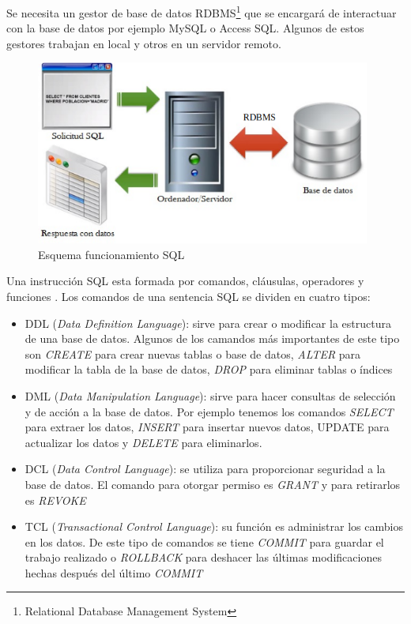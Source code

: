 Se necesita un gestor de base de datos RDBMS\footnote{Relational Database Management System}  que se encargará de interactuar con la base de datos por ejemplo MySQL o  Access SQL. Algunos de estos gestores trabajan en local y otros en un servidor remoto.\cite{rdbms}\\

\begin{figure}[H]
    \centering
    \includegraphics[width=11cm, keepaspectratio]{img/sql.png}
    \caption{Esquema funcionamiento SQL}
    \label{fig:sql}
\end{figure}
Una instrucción SQL esta formada por comandos, cláusulas, operadores y funciones . Los comandos de una sentencia SQL se dividen en cuatro tipos:
\begin{itemize}
\item DDL (\textit{Data Definition Language}): sirve para crear o modificar la estructura de una base de datos. Algunos de los camandos más importantes de este tipo son \textit{CREATE }para crear nuevas tablas o base de datos, \textit{ALTER} para modificar la tabla de la base de datos, \textit{DROP} para eliminar tablas o índices 
\item DML (\textit{Data Manipulation Language}): sirve para hacer consultas de selección y de acción a la base de datos. Por ejemplo tenemos los comandos \textit{SELECT} para extraer los datos,\textit{ INSERT} para insertar nuevos datos, UPDATE para actualizar los datos y \textit{DELETE} para eliminarlos.
\item DCL (\textit{Data Control Language}): se utiliza para proporcionar seguridad a la base de datos. El comando para otorgar permiso es \textit{GRANT} y para retirarlos es \textit{REVOKE}
\item TCL (\textit{Transactional Control Language}): su función es administrar los cambios en los datos. De este tipo de comandos se tiene \textit{COMMIT} para guardar el trabajo realizado o \textit{ROLLBACK} para deshacer las últimas modificaciones hechas después del último \textit{COMMIT}
\end{itemize}

